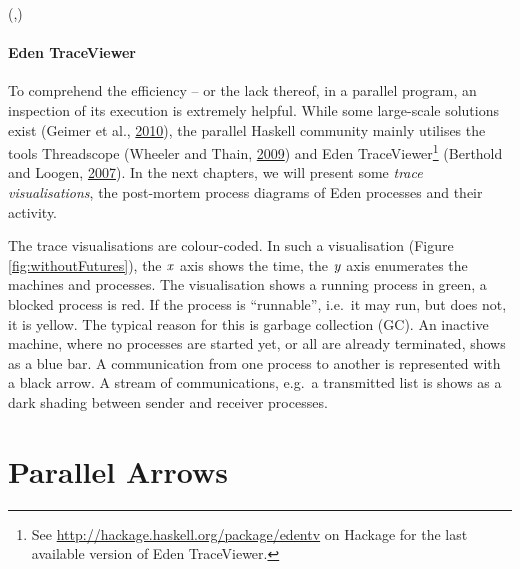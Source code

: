 \documentclass[paper=A4,twoside=true,openright,parskip=full,chapterprefix=true,headings=normal,bibliography=totoc,listof=totoc,titlepage=on,captions=tableabove,draft=false,british]{scrreprt}%
\renewcommand{\enquote}[1]{{``}#1{''}}
\begin{document}
\begin{hscode}\SaveRestoreHook
{}%
%
\>[B]{}\mathbin{::}(\;,\;)\<[E]%
\\
\>[B]{}\mathrel{=}\<[E]%
\ColumnHook
\end{hscode}\resethooks
\vspace{-2\baselineskip}

\hypertarget{eden-traceviewer}{%
\subsubsection{Eden TraceViewer}\label{eden-traceviewer}}

\label{sec:edentv}

To comprehend the efficiency -- or the lack thereof, in a parallel
program, an inspection of its execution is extremely helpful. While some
large-scale solutions exist (Geimer et al.,
\protect\hyperlink{ref-Geimer2010}{2010}), the parallel Haskell
community mainly utilises the tools Threadscope (Wheeler and Thain,
\protect\hyperlink{ref-Wheeler2009}{2009}) and Eden
TraceViewer\footnote{See \url{http://hackage.haskell.org/package/edentv}
  on Hackage for the last available version of Eden TraceViewer.}
(Berthold and Loogen, \protect\hyperlink{ref-Berthold2007a}{2007}). In
the next chapters, we will present some \emph{trace visualisations}, the
post-mortem process diagrams of Eden processes and their activity.

The trace visualisations are colour-coded. In such a visualisation
(Figure \ref{fig:withoutFutures}), the \ensuremath{\Varid{x}} axis shows the time, the \ensuremath{\Varid{y}}
axis enumerates the machines and processes. The visualisation shows a
running process in green, a blocked process is red. If the process is
\enquote{runnable}, i.e.~it may run, but does not, it is yellow. The
typical reason for this is garbage collection (GC). An inactive machine,
where no processes are started yet, or all are already terminated, shows
as a blue bar. A communication from one process to another is
represented with a black arrow. A stream of communications, e.g.~a
transmitted list is shows as a dark shading between sender and receiver
processes.

\hypertarget{parallel-arrows}{%
\chapter{Parallel Arrows}\label{parallel-arrows}}
\end{document}
